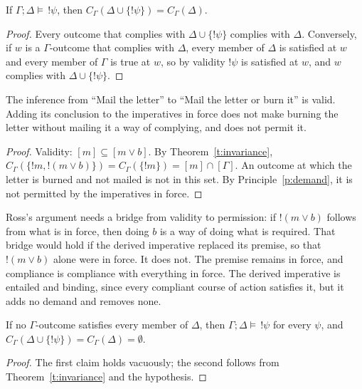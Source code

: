 \documentclass{situationist-preprint}
\begin{document}
\begin{theorem}\label{t:invariance}
If $\Gamma; \Delta \models\, !\psi$, then $C_\Gamma(\Delta \cup \{!\psi\}) = C_\Gamma(\Delta)$.
\end{theorem}

\begin{proof}
Every outcome that complies with $\Delta \cup \{!\psi\}$ complies with $\Delta$. Conversely, if $w$ is a $\Gamma$-outcome that complies with $\Delta$, every member of $\Delta$ is satisfied at $w$ and every member of $\Gamma$ is true at $w$, so by validity $!\psi$ is satisfied at $w$, and $w$ complies with $\Delta \cup \{!\psi\}$.
\end{proof}

\begin{corollary}\label{c:ross}
The inference from \enquote{Mail the letter} to \enquote{Mail the letter or burn it} is valid. Adding its conclusion to the imperatives in force does not make burning the letter without mailing it a way of complying, and does not permit it.
\end{corollary}

\begin{proof}
Validity: $[m] \subseteq [m \vee b]$. By Theorem~\ref{t:invariance}, $C_\Gamma(\{!m, !(m \vee b)\}) = C_\Gamma(\{!m\}) = [m] \cap [\Gamma]$. An outcome at which the letter is burned and not mailed is not in this set. By Principle~\ref{p:demand}, it is not permitted by the imperatives in force.
\end{proof}

Ross's argument needs a bridge from validity to permission: if $!(m \vee b)$ follows from what is in force, then doing $b$ is a way of doing what is required. That bridge would hold if the derived imperative replaced its premise, so that $!(m \vee b)$ alone were in force. It does not. The premise remains in force, and compliance is compliance with everything in force. The derived imperative is entailed and binding, since every compliant course of action satisfies it, but it adds no demand and removes none.

\begin{proposition}\label{p:explosion}
If no $\Gamma$-outcome satisfies every member of $\Delta$, then $\Gamma; \Delta \models\, !\psi$ for every $\psi$, and $C_\Gamma(\Delta \cup \{!\psi\}) = C_\Gamma(\Delta) = \emptyset$.
\end{proposition}

\begin{proof}
The first claim holds vacuously; the second follows from Theorem~\ref{t:invariance} and the hypothesis.
\end{proof}
\end{document}
